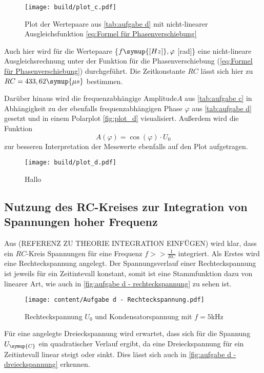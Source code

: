 \begin{figure}
  \centering
  \texttt{[image: build/plot\_c.pdf]}
  \caption{Plot der Wertepaare aus \autoref{tab:aufgabe d} mit nicht-linearer%
   Ausgleichsfunktion \autoref{eq:Formel für Phasenverschiebung}}
  \label{fig:plot_c}
\end{figure}

Auch hier wird für die Wertepaare \{$f \symup{[Hz]}, \varphi$ [rad]\} eine nicht-lineare Ausgleichsrechnung unter 
der Funktion für die Phasenverschiebung (\autoref{eq:Formel für Phasenverschiebung}) durchgeführt. Die Zeitkonstante $RC$ lässt sich
hier zu $RC = 433,62\symup{\mu s}$ bestimmen.

Darüber hinaus wird die frequenzabhängige Amplitude$A$ aus \autoref{tab:aufgabe c} in Abhängigkeit zu der
ebenfalls frequenzabhängigen Phase $\varphi$ aus \autoref{tab:aufgabe d} gesetzt und in einem Polarplot \autoref{fig:plot_d}
visualisiert. Außerdem wird die Funktion 
\begin{equation}
  A(\varphi) = \cos (\varphi) \cdot U_{0}
\end{equation}
zur besseren Interpretation der Messwerte ebenfalls auf den Plot aufgetragen.

\begin{figure}
  \centering
  \texttt{[image: build/plot\_d.pdf]}
  \caption{Hallo}
  \label{fig:plot_d}
\end{figure}

\subsection{Nutzung des RC-Kreises zur Integration von Spannungen hoher Frequenz}
Aus (REFERENZ ZU THEORIE INTEGRATION EINFÜGEN) wird klar, dass ein $RC$-Kreis Spannungen für eine Frequenz $f >> \frac{1}{RC}$
integriert. Als Erstes wird eine Rechteckspannung angelegt. Der Spannungsverlauf einer Rechteckspannung ist jeweils für ein
Zeitintevall konstant, somit ist eine Stammfunktion dazu von linearer Art, wie auch in \autoref{fig:aufgabe d - rechteckspannung}
zu sehen ist.

\begin{figure}
  \centering
  \texttt{[image: content/Aufgabe d - Rechteckspannung.pdf]}
  \caption{Rechteckspannung $U_{0}$ und Kondensatorspannung mit $f=5$kHz}
  \label{fig:aufgabe d - rechteckspannung}
\end{figure}

Für eine angelegte Dreieckspannung wird erwartet, dass sich für die Spannung $U_{\symup{C}}$ ein quadratischer Verlauf ergibt,
da eine Dreieckspannung für ein Zeitintevall linear steigt oder sinkt. Dies lässt sich auch in \autoref{fig:aufgabe d - dreieckspannung}
erkennen.


